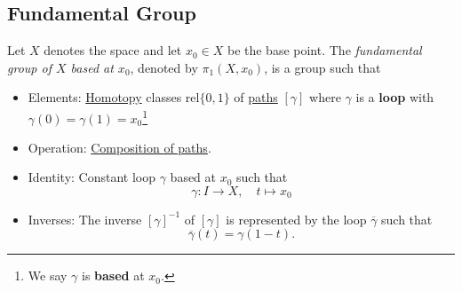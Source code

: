 \subsection{Fundamental Group}
\begin{definition}\label{def:fundamental-group}
	Let \(X\) denotes the space and let \(x_0\in X\) be the base point. The \emph{fundamental group of \(X\) based at \(x_0\)},
	denoted by \(\pi_1(X, x_0)\), is a group such that
	\begin{itemize}
		\item Elements: \hyperref[def:homotopy]{Homotopy} classes \(\mathrm{rel} \{0, 1\}\) of \hyperref[def:path]{paths} \([\gamma]\) where \(\gamma\) is a \textbf{loop}
		      with \(\gamma(0) = \gamma(1) = x_0\)\footnote{We say \(\gamma\) is \textbf{based} at \(x_0\).}
		      \begin{figure}[H]
			      \centering
			      \label{fig:def:fundamental-group-elements}
		      \end{figure}
		\item Operation: \hyperref[def:path-composition]{Composition of paths}.
		\item Identity: Constant loop \(\gamma\) based at \(x_0\) such that
		      \[
			      \gamma\colon I\to X,\quad t\mapsto x_0
		      \]
		\item Inverses: The inverse \([\gamma]^{-1}\) of \([\gamma]\) is represented by the loop \(\overline{\gamma}\) such that
		      \[
			      \overline{\gamma} (t) = \gamma(1-t).
		      \]
		      \begin{figure}[H]
			      \centering
			      \label{fig:def:fundamental-group-inverses}
		      \end{figure}
	\end{itemize}
\end{definition}
